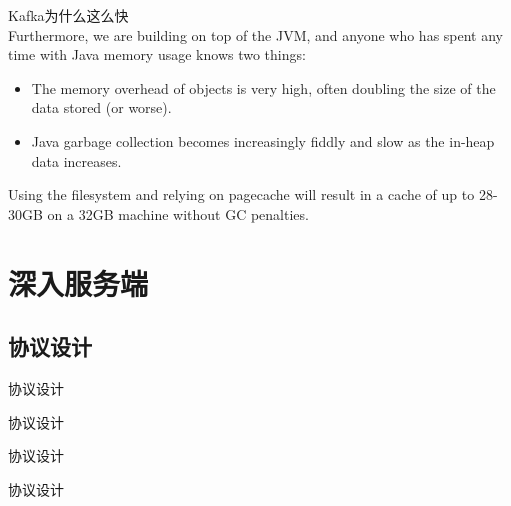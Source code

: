 \begin{frame}[plain,t]{Kafka为什么这么快} %
     \\  \vspace{2ex}
    Furthermore, we are building on top of the JVM, and anyone who has spent any time with Java memory usage knows two things:
    \begin{itemize}
        \item The memory overhead of objects is very high, often doubling the size of the data stored (or worse).
        \item Java garbage collection becomes increasingly fiddly and slow as the in-heap data increases.
    \end{itemize}

\vspace{2ex}
Using the filesystem and relying on pagecache will result in a cache of up to 28-30GB on a 32GB machine without GC penalties.
    
    
    
\end{frame}


\section{深入服务端}
\subsection{协议设计}
\begin{frame}[plain,t]{协议设计} %
	 \\  \vspace{2ex}
	
\end{frame}
\begin{frame}[plain,t]{协议设计} %
     \\  \vspace{2ex}
    
\end{frame}
\begin{frame}[plain,t]{协议设计} %
     \\  \vspace{2ex}
    
\end{frame}
\begin{frame}[plain,t]{协议设计} %
     \\  \vspace{2ex}
    
\end{frame}




